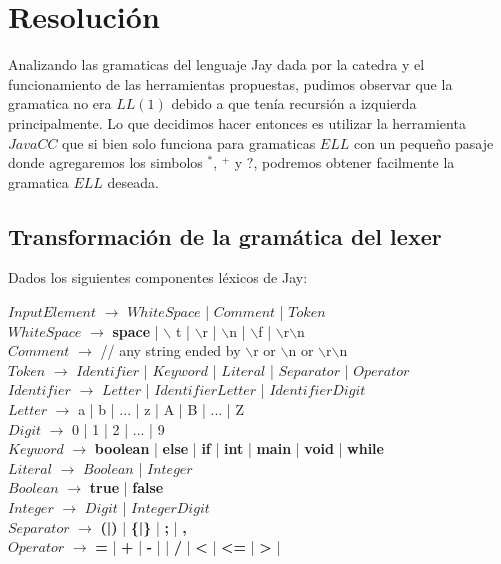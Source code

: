 \section{Resolución}

Analizando las gramaticas del lenguaje Jay dada por la catedra y el funcionamiento de las herramientas propuestas, 
pudimos observar que la gramatica no era $LL(1)$ debido a que tenía recursión a izquierda principalmente.
Lo que decidimos hacer entonces es utilizar la herramienta $JavaCC$ que si bien solo funciona para gramaticas
$ELL$ con un pequeño pasaje donde agregaremos los simbolos $^*$, $^+$ y $?$, podremos obtener facilmente la
gramatica $ELL$ deseada.

\subsection{Transformación de la gramática del lexer}

Dados los siguientes componentes léxicos de Jay:

\noindent$InputElement$ $\rightarrow$ $WhiteSpace$ | $Comment$ | $Token$ \\
$WhiteSpace$ $\rightarrow$ {\bf space} | $\backslash$ t | $\backslash$r | $\backslash$n | $\backslash$f | $\backslash$r$\backslash$n \\
$Comment$ $\rightarrow$ // any string ended by $\backslash$r or $\backslash$n or $\backslash$r$\backslash$n \\
$Token$ $\rightarrow$ $Identifier$ | $Keyword$ | $Literal$ | $Separator$ | $Operator$ \\
$Identifier$ $\rightarrow$ $Letter$ | $Identifier$$Letter$ | $Identifier$$Digit$ \\
$Letter$ $\rightarrow$ a | b | ... | z | A | B | ... | Z \\
$Digit$ $\rightarrow$ 0 | 1 | 2 | ... | 9 \\
$Keyword$ $\rightarrow$ {\bf boolean} | {\bf else} | {\bf if} | {\bf int} | {\bf main} | {\bf void} | {\bf while} \\
$Literal$ $\rightarrow$ $Boolean$ | $Integer$ \\ 
$Boolean$ $\rightarrow$ {\bf true} | {\bf false}\\
$Integer$ $\rightarrow$ $Digit$ | $Integer$$Digit$ \\
$Separator$ $\rightarrow$ {\bf (|)} | {\bf\{|\}} | {\bf;} | {\bf,}\\
$Operator$ $\rightarrow$ {\bf =} | {\bf  +} | {\bf -} | {\bf *} | {\bf /} | {\bf <} | {\bf <= } | {\bf> } |

